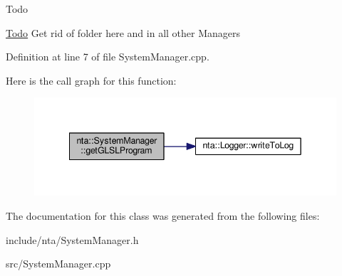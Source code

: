 \begin{DoxyRefDesc}{Todo}
\item[\hyperlink{todo__todo000001}{Todo}]Get rid of \textquotesingle{}folder\textquotesingle{} here and in all other Managers \end{DoxyRefDesc}


Definition at line 7 of file System\+Manager.\+cpp.

Here is the call graph for this function\+:
\nopagebreak
\begin{figure}[H]
\begin{center}
\leavevmode
\includegraphics[width=342pt]{db/d25/classnta_1_1SystemManager_af37be3ff4538da0a95b5ca257187077c_cgraph}
\end{center}
\end{figure}


The documentation for this class was generated from the following files\+:\begin{DoxyCompactItemize}
\item 
include/nta/System\+Manager.\+h\item 
src/System\+Manager.\+cpp\end{DoxyCompactItemize}
